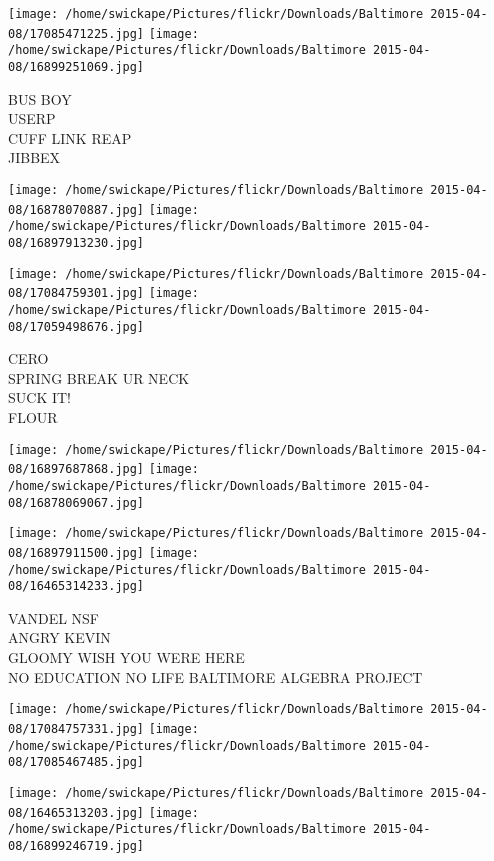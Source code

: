 \documentclass[10pt,letterpaper]{article}
\begin{document}
\texttt{[image: /home/swickape/Pictures/flickr/Downloads/Baltimore 2015-04-08/17085471225.jpg]}
\texttt{[image: /home/swickape/Pictures/flickr/Downloads/Baltimore 2015-04-08/16899251069.jpg]}

BUS BOY\\
USERP\\
CUFF LINK REAP\\
JIBBEX\\
\pagebreak

\texttt{[image: /home/swickape/Pictures/flickr/Downloads/Baltimore 2015-04-08/16878070887.jpg]}
\texttt{[image: /home/swickape/Pictures/flickr/Downloads/Baltimore 2015-04-08/16897913230.jpg]}

\texttt{[image: /home/swickape/Pictures/flickr/Downloads/Baltimore 2015-04-08/17084759301.jpg]}
\texttt{[image: /home/swickape/Pictures/flickr/Downloads/Baltimore 2015-04-08/17059498676.jpg]}

CERO\\
SPRING BREAK UR NECK\\
SUCK IT!\\
FLOUR\\
\pagebreak

\texttt{[image: /home/swickape/Pictures/flickr/Downloads/Baltimore 2015-04-08/16897687868.jpg]}
\texttt{[image: /home/swickape/Pictures/flickr/Downloads/Baltimore 2015-04-08/16878069067.jpg]}

\texttt{[image: /home/swickape/Pictures/flickr/Downloads/Baltimore 2015-04-08/16897911500.jpg]}
\texttt{[image: /home/swickape/Pictures/flickr/Downloads/Baltimore 2015-04-08/16465314233.jpg]}

VANDEL NSF\\
ANGRY KEVIN\\
GLOOMY WISH YOU WERE HERE\\
NO EDUCATION NO LIFE BALTIMORE ALGEBRA PROJECT\\
\pagebreak

\texttt{[image: /home/swickape/Pictures/flickr/Downloads/Baltimore 2015-04-08/17084757331.jpg]}
\texttt{[image: /home/swickape/Pictures/flickr/Downloads/Baltimore 2015-04-08/17085467485.jpg]}

\texttt{[image: /home/swickape/Pictures/flickr/Downloads/Baltimore 2015-04-08/16465313203.jpg]}
\texttt{[image: /home/swickape/Pictures/flickr/Downloads/Baltimore 2015-04-08/16899246719.jpg]}
\end{document}
